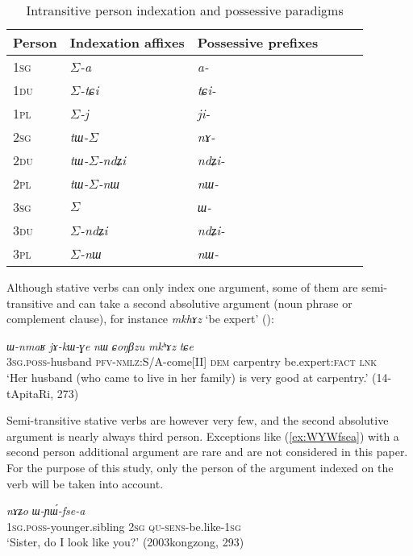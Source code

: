 \documentclass[11pt]{article}
\newcommand{\ipa}[1]{{\phon\textit{#1}}} %
\newcommand{\refb}[1]{(\ref{#1})}
\newcommand{\ro}{$\Sigma$}
\begin{document}
\begin{table}[H]
\caption{Intransitive person indexation and possessive paradigms} \label{tab:indexation} \centering
\begin{tabular}{llllll}
\toprule 
Person & Indexation affixes & Possessive prefixes \\
\midrule
\textsc{1sg} & \ro{}\ipa{-a} & \ipa{a-} \\
\textsc{1du} & \ro{}\ipa{-tɕi} & \ipa{tɕi-} \\
\textsc{1pl} & \ro{}\ipa{-j} & \ipa{ji-} \\
\midrule
\textsc{2sg} & \ipa{tɯ-}\ro{} & \ipa{nɤ-} \\
\textsc{2du} & \ipa{tɯ-}\ro{}\ipa{-ndʑi} &\ipa{ndʑi-}\\
\textsc{2pl} & \ipa{tɯ-}\ro{}\ipa{-nɯ} & \ipa{nɯ-}\\
\midrule
\textsc{3sg} & \ro{} & \ipa{ɯ-} \\
\textsc{3du} & \ro{}\ipa{-ndʑi} & \ipa{ndʑi-}\\
\textsc{3pl} & \ro{}\ipa{-nɯ} &\ipa{nɯ-}  \\
\bottomrule
\end{tabular}
\end{table}

Although stative verbs can only index one argument, some of them are semi-transitive and can take a second absolutive argument (noun phrase or complement clause), for instance \ipa{mkhɤz} `be expert' (\citealt[275]{jacques16complementation}):

\begin{exe}
\ex \label{ex:CoNBzu.mkhAz}
\gll 
\ipa{ɯ-nmaʁ} 	\ipa{jɤ-kɯ-ɣe} 	\ipa{nɯ} 	\ipa{ɕoŋβzu} 	\ipa{mkʰɤz} 	\ipa{tɕe} \\
\textsc{3sg.poss}-husband \textsc{pfv-nmlz}:S/A-come[II] \textsc{dem} carpentry be.expert:\textsc{fact} \textsc{lnk} \\
\glt `Her husband (who came to live in her family) is very good at carpentry.' (14-tApitaRi, 273)
\end{exe}

Semi-transitive stative verbs are however very few, and the second absolutive argument is nearly always third person. Exceptions like \refb{ex:WYWfsea} with a second person additional argument are rare and are not considered in this paper. For the purpose of this study, only the person of the argument indexed on the verb will be taken into account.


\begin{exe}
\ex \label{ex:WYWfsea}
\gll \ipa{a-ʁi,} 	\ipa{nɤʑo} 	\ipa{ɯ-ɲɯ́-fse-a} \\
\textsc{1sg.poss}-younger.sibling \textsc{2sg} \textsc{qu-sens}-be.like-\textsc{1sg} \\
\glt `Sister, do I look like you?' (2003kongzong, 293)
\end{exe}
\end{document}
